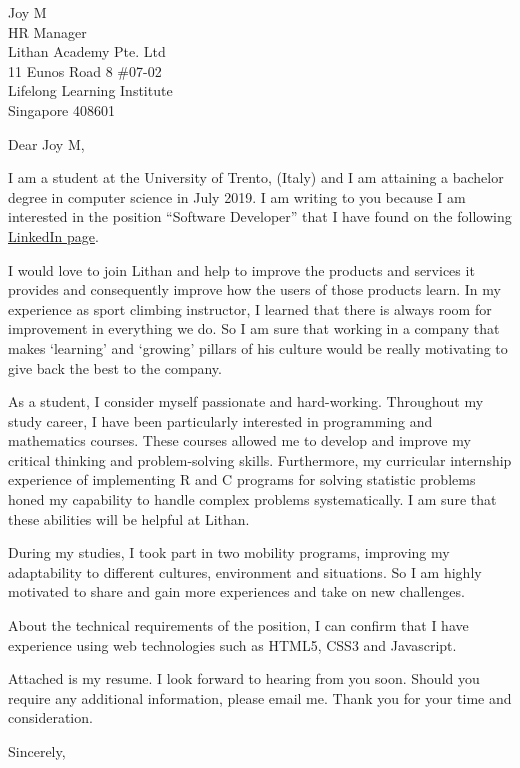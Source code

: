 \documentclass[a4paper]{letter}
\begin{document}
\begin{letter}{
    Joy M \\
    HR Manager\\
    Lithan Academy Pte. Ltd\\
    11 Eunos Road 8 \#07-02 \\
    Lifelong Learning Institute\\
    Singapore 408601}

\opening{Dear Joy M,}
I am a student at the University of Trento, (Italy) and I am attaining a bachelor degree in computer science in July 2019. I am writing to you because I am interested in the position ``Software Developer'' that I have found on the following \href{https://www.linkedin.com/jobs/view/1341905034/}{LinkedIn page}.

I would love to join Lithan and help to improve the products and services it provides and consequently improve how the users of those products learn. In my experience as sport climbing instructor, I learned that there is always room for improvement in everything we do. So I am sure that working in a company that makes `learning' and `growing' pillars of his culture would be really motivating to give back the best to the company. 

As a student, I consider myself passionate and hard-working. Throughout my study career, I have been particularly interested in programming and mathematics courses. These courses allowed me to develop and improve my critical thinking and problem-solving skills. Furthermore, my curricular internship experience of implementing R and C programs for solving statistic problems honed my capability to handle complex problems systematically. I am sure that these abilities will be helpful at Lithan.

During my studies, I took part in two mobility programs, improving my adaptability to different cultures, environment and situations. So I am highly motivated to share and gain more experiences and take on new challenges.

About the technical requirements of the position, I can confirm that I have experience using web technologies such as HTML5, CSS3 and Javascript.

Attached is my resume. I look forward to hearing from you soon.
Should you require any additional information, please email me.
Thank you for your time and consideration.
\closing{Sincerely,}
\end{letter}
\end{document}
